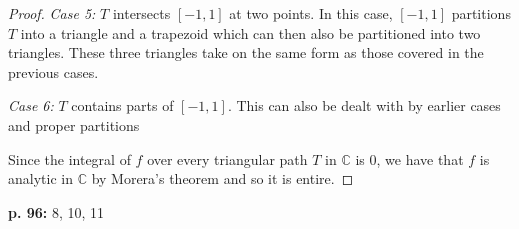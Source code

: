\documentclass[11pt,oneside,english]{amsart}
\theoremstyle{definition}
\newcommand{\MB}[1]{\mathbb{#1}}
\begin{document}
\begin{enumerate}[leftmargin=*]
\begin{proof}
\textit{Case 5:} $T$ intersects $[-1,1]$ at two points. In this case, $[-1,1]$ partitions $T$ into a triangle and a trapezoid which can then also be partitioned into two triangles. These three triangles take on the same form as those covered in the previous cases.

\textit{Case 6:} $T$ contains parts of $[-1,1]$. This can also be dealt with by earlier cases and proper partitions

Since the integral of $f$ over every triangular path $T$ in $\MB{C}$ is 0, we have that $f$ is analytic in $\MB{C}$ by Morera's theorem and so it is entire.
\end{proof}
\end{enumerate}

\pagebreak



\textbf{p. 96:} 8, 10, 11
\end{document}
